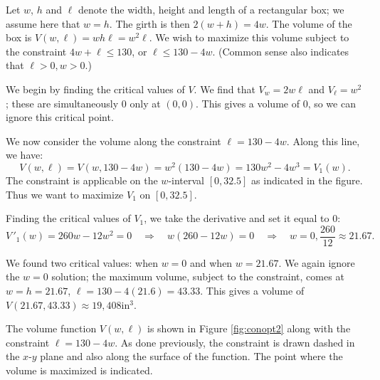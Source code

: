 {Let $w$, $h$ and $\ell$ denote the width, height and length of a rectangular box; we assume here that $w=h$. The girth is then $2(w+h) = 4w$. The volume of the box is $V(w,\ell) = wh\ell = w^2\ell$. We wish to maximize this volume subject to the constraint $4w+\ell\leq 130$, or $\ell\leq 130-4w$. (Common sense also indicates that $\ell>0, w>0$.)

We begin by finding the critical values of $V$. We find that $V_w = 2w\ell$ and $V_\ell = w^2$; these are simultaneously 0 only at $(0,0)$. This gives a volume of 0, so we can ignore this critical point. 

We now consider the volume along the constraint $\ell=130-4w.$ Along this line, we have:
$$V(w,\ell) = V(w,130-4w) = w^2(130-4w) = 130w^2-4w^3 = V_1(w).$$
The constraint is applicable on the $w$-interval $[0,32.5]$ as indicated in the figure. Thus we want to maximize $V_1$ on $[0,32.5]$. 

Finding the critical values of $V_1$, we take the derivative and set it equal to 0:
$$V\,'_1(w) = 260w-12w^2 = 0 \quad \Rightarrow \quad w(260-12w)= 0 \quad \Rightarrow \quad w=0,\frac{260}{12}\approx 21.67.$$

We found two critical values: when $w=0$ and when $w=21.67$. We again ignore the $w=0$ solution; the maximum volume, subject to the constraint, comes at $w=h=21.67$, $\ell = 130-4(21.6) =43.33.$ This gives a volume of $V(21.67,43.33) \approx 19,408$in$^3$. 


The volume function $V(w,\ell)$ is shown in Figure \ref{fig:conopt2} along with the constraint $\ell = 130-4w$. As done previously, the constraint is drawn dashed in the $x$-$y$ plane and also along the surface of the function. The point where the volume is maximized is indicated.
}\\

